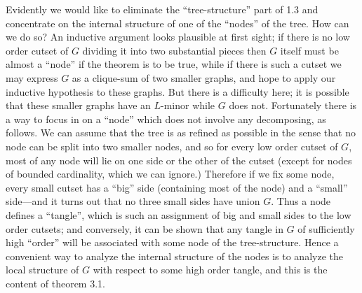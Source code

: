 Evidently we would like to eliminate the ``tree-structure'' part of 1.3 and concentrate on the internal structure of one of the ``nodes'' of the tree. How can we do so? An inductive argument looks plausible at first sight; if there is no low order cutset of $G$ dividing it into two substantial pieces then $G$ itself must be almost a ``node'' if the theorem is to be true, while if there is such a cutset we may express $G$ as a clique-sum of two smaller graphs, and hope to apply our inductive hypothesis to these graphs. But there is a difficulty here; it is possible that these smaller graphs have an $L$-minor while $G$ does not. Fortunately there is a way to focus in on a ``node'' which does not involve any decomposing, as follows. We can assume that the tree is as refined as possible in the sense that no node can be split into two smaller nodes, and so for every low order cutset of $G$, most of any node will lie on one side or the other of the cutset (except for nodes of bounded cardinality, which we can ignore.) Therefore if we fix some node, every small cutset has a ``big'' side (containing most of the node) and a ``small'' side---and it turns out that no three small sides have union $G$. Thus a node defines a ``tangle'', which is such an assignment of big and small sides to the low order cutsets; and conversely, it can be shown that any tangle in $G$ of sufficiently high ``order'' will be associated with some node of the tree-structure. Hence a convenient way to analyze the internal structure of the nodes is to analyze the local structure of $G$ with respect to some high order tangle, and this is the content of theorem 3.1.

